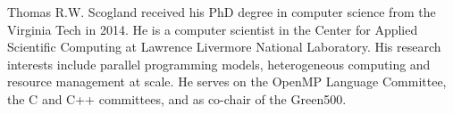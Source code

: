 \begin{IEEEbiography}{Thomas R.W. Scogland}
received his PhD degree in computer science from the
Virginia Tech in 2014. 
He is a computer scientist in 
the Center for Applied Scientific Computing at Lawrence Livermore National
Laboratory. His research interests include parallel programming models,
heterogeneous computing and resource management at scale.
He serves on the OpenMP Language Committee, the C and C++ committees, and as
co-chair of the Green500.
\end{IEEEbiography}

